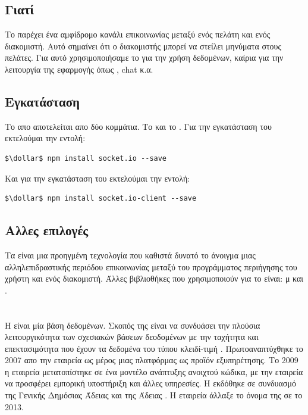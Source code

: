 \subsection*{Γιατί}
\pSpace Το  παρέχει ένα αμφίδρομο κανάλι επικοινωνίας μεταξύ ενός πελάτη και ενός διακομιστή. Αυτό σημαίνει ότι ο διακομιστής μπορεί να στείλει μηνύματα στους πελάτες. Για αυτό χρησιμοποιήσαμε το  για την χρήση  δεδομένων, καίρια για την λειτουργία της εφαρμογής όπως , chat κ.α. 

\subsection*{Εγκατάσταση}
\pSpace Το  απο αποτελείται απο δύο κομμάτια. Το  και το . Για την εγκατάσταση του  εκτελούμαι την εντολή:
    \begin{lstlisting}[language=command.com]
    $\dollar$ npm install socket.io --save
    \end{lstlisting}
Και για την εγκατάσταση του  εκτελούμαι την εντολή:
    \begin{lstlisting}[language=command.com]
    $\dollar$ npm install socket.io-client --save
    \end{lstlisting}

\subsection*{Αλλες επιλογές}
\pSpace Τα  είναι μια προηγμένη τεχνολογία που καθιστά δυνατό το άνοιγμα μιας αλληλεπιδραστικής περιόδου επικοινωνίας μεταξύ του προγράμματος περιήγησης του χρήστη και ενός διακομιστή. Άλλες  βιβλιοθήκες που χρησιμοποιούν  για το  είναι: μ και 
.

\section{}
\pSpace Η  είναι μία  βάση δεδομένων. Σκοπός της είναι να συνδυάσει την πλούσια λειτουργικότητα των σχεσιακών βάσεων δεοδομένων με την ταχήτητα και επεκτασιμότητα που έχουν τα δεδομένα του τύπου κλειδί-τιμή . Πρωτοαναπτύχθηκε το 2007 απο την εταιρεία  ως μέρος μιας πλατφόρμας ως προϊόν εξυπηρέτησης. Το 2009 η εταιρεία μετατοπίστηκε σε ένα μοντέλο ανάπτυξης ανοιχτού κώδικα, με την εταιρεία να προσφέρει εμπορική υποστήριξη και άλλες υπηρεσίες. Η  εκδόθηκε σε συνδυασμό της Γενικής Δημόσιας Άδειας  και της Άδειας . Η εταιρεία  άλλαξε το όνομα της σε  το 2013. 

